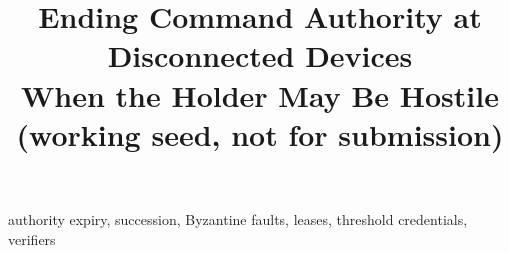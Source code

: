\documentclass[conference]{IEEEtran}
\newif\ifanon
\theoremstyle{plain}
\theoremstyle{definition}
\begin{document}
\title{Ending Command Authority at Disconnected Devices\\
When the Holder May Be Hostile\\
{\large (working seed, not for submission)}}
\ifanon
  \author{\IEEEauthorblockN{Anonymous authors}\IEEEauthorblockA{Affiliation withheld for review}}
\else
  
\fi
\maketitle

\begin{abstract}

\end{abstract}

\begin{IEEEkeywords}
authority expiry, succession, Byzantine faults, leases, threshold credentials, verifiers
\end{IEEEkeywords}











\label{end-of-main-text}

\ifanon\else
  
\fi




\appendices


\end{document}
